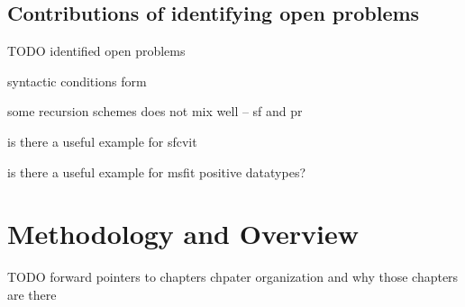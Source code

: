 \subsection{Contributions of identifying open problems}
TODO identified open problems

syntactic conditions form \McvPr


some recursion schemes does not mix well -- sf and pr

is there a useful example for sfcvit

is there a useful example for msfit positive datatypes?


\section{Methodology and Overview}\label{sec:intro:overview}
TODO forward pointers to chapters
chpater organization and why those chapters are there

